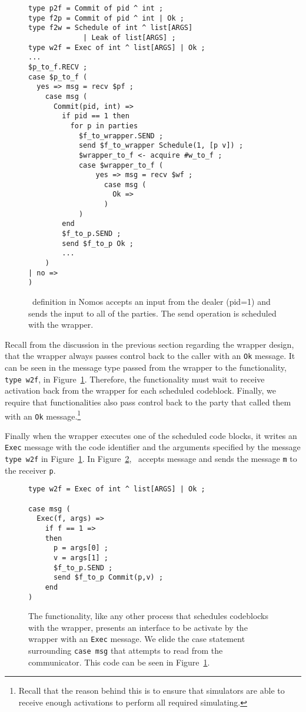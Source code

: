 \begin{figure}
\begin{lstlisting}[basicstyle=\small\ttfamily, frame=single]
type p2f = Commit of pid ^ int ;
type f2p = Commit of pid ^ int | Ok ;
type f2w = Schedule of int ^ list[ARGS] 
             | Leak of list[ARGS] ;
type w2f = Exec of int ^ list[ARGS] | Ok ;
...
$p_to_f.RECV ;
case $p_to_f (
  yes => msg = recv $pf ;
    case msg (
      Commit(pid, int) => 
        if pid == 1 then
    	  for p in parties
    	    $f_to_wrapper.SEND ;
    	    send $f_to_wrapper Schedule(1, [p v]) ;
    	    $wrapper_to_f <- acquire #w_to_f ;
    	    case $wrapper_to_f (
    	    	yes => msg = recv $wf ;
    	  	      case msg (
    	  	        Ok =>
    	  	      )
    	    )
    	end
    	$f_to_p.SEND ;
    	send $f_to_p Ok ;
    	...
    )
| no =>
)
\end{lstlisting}
\caption{\Frbc~definition in Nomos accepts an input from the dealer (pid=1) and \Eventually sends the input to all of the parties. The send operation is scheduled with the wrapper.}
\label{fig:nomos:frbc}
\end{figure}

Recall from the discussion in the previous section regarding the wrapper design, that the wrapper always passes control back to the caller with an \texttt{Ok} message.
It can be seen in the message type passed from the wrapper to the functionality, \texttt{type w2f}, in Figure~\ref{fig:nomos:frbc}.
Therefore, the functionality must wait to receive activation back from the wrapper for each scheduled codeblock.
Finally, we require that functionalities also pass control back to the party that called them with an \texttt{Ok} message.\footnote{Recall that the reason behind this is to ensure that simulators are able to receive enough activations to perform all required simulating.}

Finally when the wrapper executes one of the scheduled code blocks, it writes an \texttt{Exec} message with the code identifier and the arguments specified by the message \texttt{type w2f} in Figure~\ref{fig:nomos:frbc}.
In Figure~\ref{fig:nomos:frbcexec}, \Frbc~accepts \Exec message and sends the message \texttt{m} to the receiver \texttt{p}.

\begin{figure}
\begin{lstlisting}[basicstyle=\small\ttfamily, frame=single]
type w2f = Exec of int ^ list[ARGS] | Ok ; 

case msg (
  Exec(f, args) =>
    if f == 1 =>
	then
	  p = args[0] ;
	  v = args[1] ;
	  $f_to_p.SEND ;
	  send $f_to_p Commit(p,v) ;
	end
)
\end{lstlisting}
\caption{The functionality, like any other process that schedules codeblocks with the wrapper, presents an interface to be activate by the wrapper with an \texttt{Exec} message. We elide the case statement surrounding \texttt{case msg} that attempts to read from the communicator. This code can be seen in Figure~\ref{fig:nomos:frbc}.}
\label{fig:nomos:frbcexec}
\end{figure}

